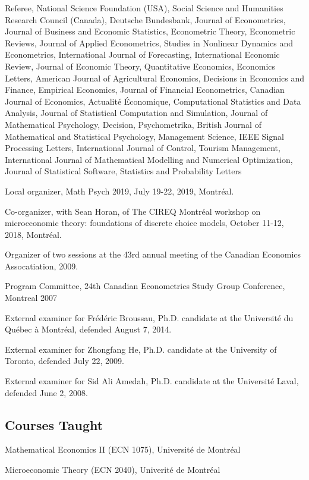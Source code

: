 \documentclass[12pt]{article}
\begin{document}
Referee,
National Science Foundation (USA),
Social Science and Humanities Research Council (Canada),
Deutsche Bundesbank,
Journal of Econometrics,
Journal of Business and Economic Statistics,
Econometric Theory,
Econometric Reviews,
Journal of Applied Econometrics,
Studies in Nonlinear Dynamics and Econometrics,
International Journal of Forecasting,
International Economic Review,
Journal of Economic Theory,
Quantitative Economics,
Economics Letters,
American Journal of Agricultural Economics,
Decisions in Economics and Finance,
Empirical Economics,
Journal of Financial Econometrics,
Canadian Journal of Economics,
Actualit\'e \'Economique,
Computational Statistics and Data Analysis,
Journal of Statistical Computation and Simulation,
Journal of Mathematical Psychology,
Decision,
Psychometrika,
British Journal of Mathematical and Statistical Psychology,
Management Science,
IEEE Signal Processing Letters,
International Journal of Control,
Tourism Management,
International Journal of Mathematical Modelling and Numerical Optimization,
Journal of Statistical Software,
Statistics and Probability Letters

Local organizer, Math Psych 2019, July 19-22, 2019, Montr\'eal.

Co-organizer, with Sean Horan, of 
The CIREQ Montr\'eal workshop on microeconomic theory: foundations of discrete choice models, October 11-12, 2018, Montr\'eal.

Organizer of two sessions at the 43rd annual meeting of the Canadian Economics Assocatiation, 2009.

Program Committee, 24th Canadian Econometrics Study Group Conference, Montreal 2007

External examiner for Fr\'ed\'eric Broussau,
Ph.D. candidate at the Universit\'e du Qu\'ebec \`a Montr\'eal,
defended August 7, 2014.

External examiner for Zhongfang He,
Ph.D. candidate at the University of Toronto,
defended July 22, 2009.

External examiner for Sid Ali Amedah,
Ph.D. candidate at the Universit\'e Laval,
defended June 2, 2008.

\subsection*{Courses Taught}

Mathematical Economics II (ECN 1075), Universit\'e de Montr\'eal

Microeconomic Theory (ECN 2040), Univerit\'e de Montr\'eal
\end{document}
